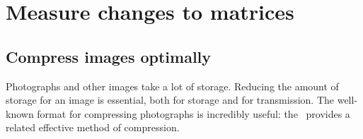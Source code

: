 
\section{Measure changes to matrices}
\label{sec:mctm}
\secttoc



\subsection{Compress images optimally}
\label{sec:ciio}


Photographs and other images take a lot of storage.
Reducing the amount of storage for an image is essential, both for storage and for transmission.
The well-known  format for compressing photographs is incredibly useful: the \svd\ provides a related effective method of compression.

\begin{comment} 
Introduce digital {image compression} by \svd{}s \pooliv{p.607--8} \holti{p.336--7}  \cite[\S07]{Davis99a}  \cite[Ch.~9, 11]{Chartier2015}.
\end{comment}


